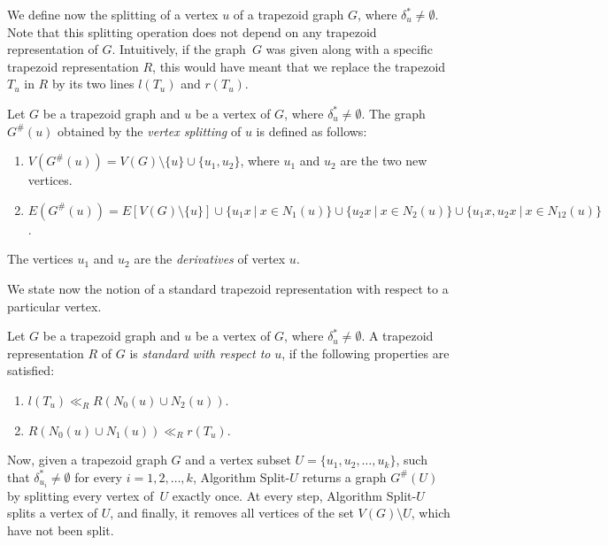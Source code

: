 \documentclass[proceedings]{stacs}
\begin{document}
We define now the splitting of a vertex $u$ of a trapezoid graph $G$, where 
${\delta_{u}^{\ast }\neq \emptyset}$. 
Note that this splitting operation does not depend on any trapezoid representation of $G$.
Intuitively, if the graph~$G$ was given along with a specific trapezoid representation $R$, 
this would have meant that we replace the trapezoid $T_{u}$ in $R$ by its two lines $l(T_{u})$ 
and $r(T_{u})$.%

\begin{definition}
\label{splitting}Let $G$ be a trapezoid graph and $u$ be a vertex of $G$,
where ${\delta_{u}^{\ast}\neq \emptyset}$. The graph $G^{\#}(u)$ obtained by
the \emph{vertex splitting} of $u$ is defined as follows:
\begin{enumerate}
\item $V(G^{\#}(u))=V(G)\setminus \{u\}\cup \{u_{1},u_{2}\}$, where $u_{1}$
and $u_{2}$ are the two new vertices.
\item $E(G^{\#}(u))=E[V(G)\setminus \{u\}]\cup \{u_{1}x\ |\ x\in
N_{1}(u)\}\cup \{u_{2}x\ |\ x\in N_{2}(u)\}\cup \{u_{1}x,u_{2}x\ |\ x\in
N_{12}(u)\}$.
\end{enumerate}
The vertices $u_{1}$ and $u_{2}$ are the \emph{derivatives} of vertex $u$.
\end{definition}

We state now the notion of a standard trapezoid representation with respect
to a particular vertex. 

\begin{definition}
\label{standard}Let $G$ be a trapezoid graph and $u$ be a vertex of $G$,
where ${\delta_{u}^{\ast}\neq \emptyset}$. A trapezoid representation $R$ of 
$G$ is \emph{standard with respect to} $u$, if the following properties are
satisfied:
\begin{enumerate}
\item $l(T_{u})\ll_{R}R(N_{0}(u)\cup N_{2}(u))$.
\item $R(N_{0}(u)\cup N_{1}(u))\ll _{R}r(T_{u})$.
\end{enumerate}
\end{definition}

Now, given a trapezoid graph $G$ and a vertex subset $U=\{u_{1},u_{2},%
\ldots,u_{k}\}$, such that $\delta_{u_{i}}^{\ast }\neq \emptyset $ for every 
$i=1,2,\ldots ,k$, Algorithm Split-$U$ returns a graph $G^{\#}(U)$ by
splitting every vertex of~$U$ exactly once. At every step, Algorithm Split-$U
$ splits a vertex of $U$, and finally, it removes all vertices of the set $%
V(G)\setminus U$, which have not been split.
\end{document}
